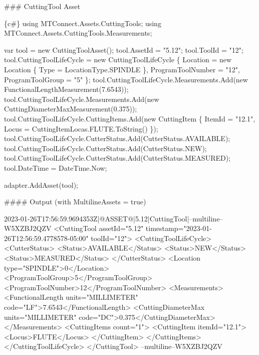 \#\#\# Cutting\+Tool Asset 
\begin{DoxyCode}
\{c#\}
using MTConnect.Assets.CuttingTools;
using MTConnect.Assets.CuttingTools.Measurements;

var tool = new CuttingToolAsset();
tool.AssetId = "5.12";
tool.ToolId = "12";
tool.CuttingToolLifeCycle = new CuttingToolLifeCycle
\{
    Location = new Location \{ Type = LocationType.SPINDLE \},
    ProgramToolNumber = "12",
    ProgramToolGroup = "5"
\};
tool.CuttingToolLifeCycle.Measurements.Add(new FunctionalLengthMeasurement(7.6543));
tool.CuttingToolLifeCycle.Measurements.Add(new CuttingDiameterMaxMeasurement(0.375));
tool.CuttingToolLifeCycle.CuttingItems.Add(new CuttingItem
\{
    ItemId = "12.1",
    Locus = CuttingItemLocas.FLUTE.ToString()
\});
tool.CuttingToolLifeCycle.CutterStatus.Add(CutterStatus.AVAILABLE);
tool.CuttingToolLifeCycle.CutterStatus.Add(CutterStatus.NEW);
tool.CuttingToolLifeCycle.CutterStatus.Add(CutterStatus.MEASURED);
tool.DateTime = DateTime.Now;

adapter.AddAsset(tool);
\end{DoxyCode}
 \#\#\#\# Output (with Multiline\+Assets = true) 
\begin{DoxyCode}
2023-01-26T17:56:59.9694353Z|@ASSET@|5.12|CuttingTool|--multiline--W5XZBJ2QZV
<CuttingTool assetId="5.12" timestamp="2023-01-26T12:56:59.4778578-05:00" toolId="12">
  <CuttingToolLifeCycle>
    <CutterStatus>
      <Status>AVAILABLE</Status>
      <Status>NEW</Status>
      <Status>MEASURED</Status>
    </CutterStatus>
    <Location type="SPINDLE">0</Location>
    <ProgramToolGroup>5</ProgramToolGroup>
    <ProgramToolNumber>12</ProgramToolNumber>
    <Measurements>
      <FunctionalLength units="MILLIMETER" code="LF">7.6543</FunctionalLength>
      <CuttingDiameterMax units="MILLIMETER" code="DC">0.375</CuttingDiameterMax>
    </Measurements>
    <CuttingItems count="1">
      <CuttingItem itemId="12.1">
        <Locus>FLUTE</Locus>
      </CuttingItem>
    </CuttingItems>
  </CuttingToolLifeCycle>
</CuttingTool>
--multiline--W5XZBJ2QZV
\end{DoxyCode}


